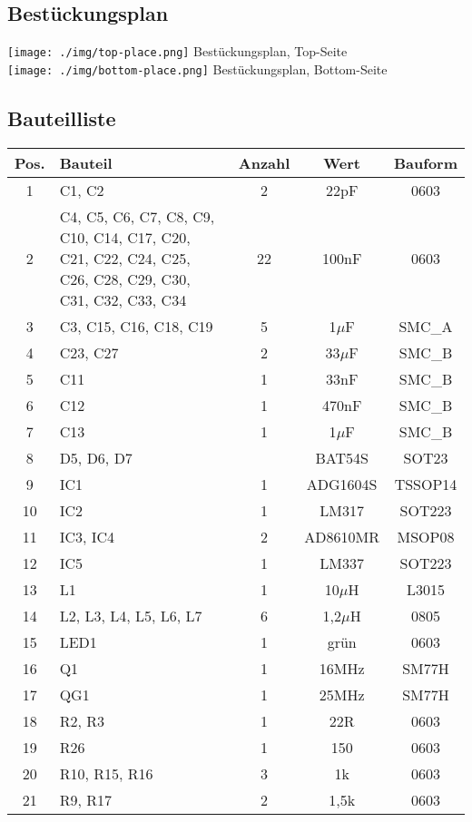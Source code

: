 \subsection{Bestückungsplan}
\begin{center}
\texttt{[image: ./img/top-place.png]}
Bestückungsplan, Top-Seite
\bigskip \\
\texttt{[image: ./img/bottom-place.png]}
Bestückungsplan, Bottom-Seite
\pagebreak
\subsection{Bauteilliste}
\begin{tabular}{|c|p{5cm}|c|c|c|}
\hline
Pos. & Bauteil & Anzahl & Wert & Bauform \\ \hline
1 & C1, C2 &2 & 22pF & 0603 \\ \hline
2 & C4, C5, C6, C7, C8, C9, C10, C14, C17, C20, C21, C22, C24, C25, C26, C28, C29, C30, C31, C32, C33, C34 & 22 & 100nF & 0603 \\ \hline
3 & C3, C15, C16, C18, C19 & 5 & 1$\mu$F & SMC\_A \\ \hline
4 & C23, C27 & 2 & 33$\mu$F & SMC\_B \\ \hline
5 & C11 & 1 & 33nF & SMC\_B \\ \hline
6 & C12 & 1 & 470nF & SMC\_B \\ \hline
7 & C13 & 1 & 1$\mu$F & SMC\_B \\ \hline
8 & D5, D6, D7 && BAT54S & SOT23 \\ \hline
9 & IC1 & 1 & ADG1604S & TSSOP14 \\ \hline
10 & IC2 & 1 & LM317 & SOT223  \\ \hline
11 & IC3, IC4 & 2 & AD8610MR & MSOP08  \\ \hline
12 & IC5 & 1 & LM337 & SOT223  \\ \hline
13 & L1 & 1 & 10$\mu$H & L3015 \\ \hline
14 & L2, L3, L4, L5, L6, L7 & 6 & 1,2$\mu$H & 0805 \\ \hline
15 & LED1 & 1 & grün & 0603 \\ \hline
16 & Q1 & 1 & 16MHz & SM77H \\ \hline
17 & QG1 & 1 & 25MHz & SM77H \\ \hline
18 & R2, R3 & 1 & 22R & 0603 \\ \hline
19 & R26 & 1 & 150  & 0603 \\ \hline
20 & R10, R15, R16 & 3 & 1k & 0603 \\ \hline
21 & R9, R17 & 2 & 1,5k & 0603 \\ \hline

\end{tabular}
\end{center}
